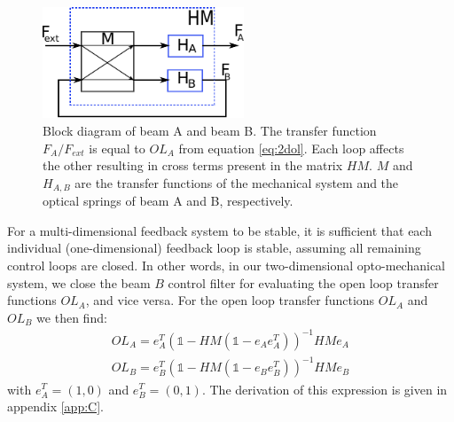 \begin{figure}[htbp]
		\includegraphics[width=6cm]{./figures/block_mimo_paper.pdf}
	\caption[Multi-Dimensional Mechanical Transfer Function]{
        Block diagram of beam A and beam B. The transfer function $F_A/F_{ext}$ is equal to $OL_A$ from equation \ref{eq:2dol}. Each loop affects the other resulting in cross terms
	present in the matrix $HM$. $M$ and $H_{A,B}$ are the transfer functions of the mechanical system and the optical springs of beam A and B, respectively.}
	\label{fig:block_loops}
\end{figure}


For a multi-dimensional feedback system to be stable, it is sufficient that each individual (one-dimensional) feedback loop is stable, assuming all remaining control loops are closed. In other words, in our two-dimensional opto-mechanical system, we close the beam $B$ control filter for evaluating the open loop transfer functions $OL_{A}$, and vice versa. For the open loop transfer functions $OL_{A}$ and $OL_{B}$ we then find: 
\begin{eqnarray}
\label{eq:2dol}
OL_{A}=e_A^{T}\left(\mathds{1}-HM (\mathds{1} - e_A e_A^T) \right)^{-1}HMe_A  \\
OL_{B}=e_B^{T}\left(\mathds{1}-HM (\mathds{1} - e_B e_B^T) \right)^{-1}HMe_B \nonumber
\end{eqnarray}
with $e_A^T=(1,0)$ and $e_B^T=(0,1)$. The derivation of this expression is given in appendix \ref{app:C}.


